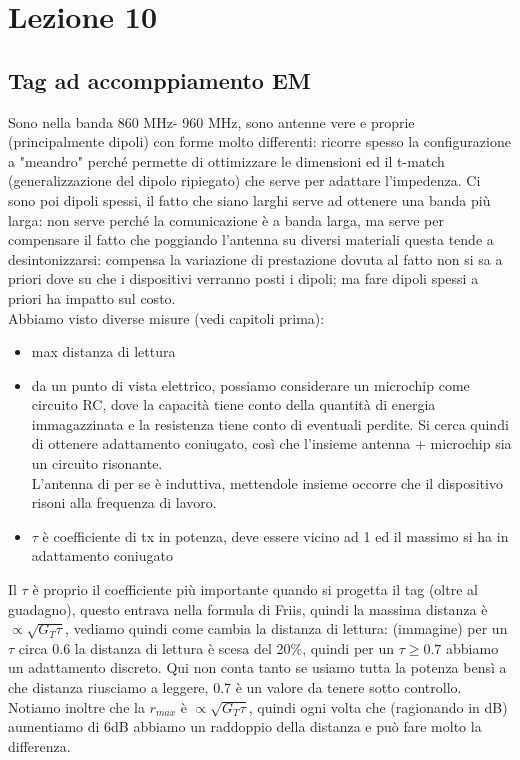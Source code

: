 \documentclass[oneside, 12pt]{extbook}
\begin{document}
\chapter{Lezione 10}
\section{Tag ad accomppiamento EM}
Sono nella banda 860 MHz- 960 MHz, sono antenne vere e proprie (principalmente dipoli) con forme molto differenti: ricorre spesso la configurazione a "meandro" perché permette di ottimizzare le dimensioni ed il t-match (generalizzazione del dipolo ripiegato) che serve per adattare l'impedenza. Ci sono poi dipoli spessi, il fatto che siano larghi serve ad ottenere una banda più larga: non serve perché la comunicazione è a banda larga, ma serve per compensare il fatto che poggiando l'antenna su diversi materiali questa tende a desintonizzarsi: compensa la variazione di prestazione dovuta al fatto non si sa a priori dove su che i dispositivi verranno posti i dipoli; ma fare dipoli spessi a priori ha impatto sul costo.\\Abbiamo visto diverse misure (vedi capitoli prima):
\begin{itemize}
	\item max distanza di lettura
	\item da un punto di vista elettrico, possiamo considerare un microchip come circuito RC, dove la capacità tiene conto della quantità di energia immagazzinata e la resistenza tiene conto di eventuali perdite. Si cerca quindi di ottenere adattamento coniugato, così che l'insieme antenna + microchip sia un circuito risonante.\\L'antenna di per se è induttiva, mettendole insieme occorre che il dispositivo risoni alla frequenza di lavoro.
	\item $\tau$ è coefficiente di tx in potenza, deve essere vicino ad 1 ed il massimo si ha in adattamento coniugato
\end{itemize}
Il $\tau$ è proprio il coefficiente più importante quando si progetta il tag (oltre al guadagno), questo entrava nella formula di Friis, quindi la massima distanza è $\propto \sqrt{G_T \tau}$, vediamo quindi come cambia la distanza di lettura: (immagine)
per un $\tau$ circa 0.6 la distanza di lettura è scesa del 20\%, quindi per un $\tau \geq 0.7$ abbiamo un adattamento discreto. Qui non conta tanto se usiamo tutta la potenza bensì a che distanza riusciamo a leggere, 0.7 è un valore da tenere sotto controllo.\\Notiamo inoltre che la $r_{max}$ è $\propto \sqrt{G_T \tau}$, quindi ogni volta che (ragionando in dB) aumentiamo di 6dB abbiamo un raddoppio della distanza e può fare molto la differenza.
\end{document}
